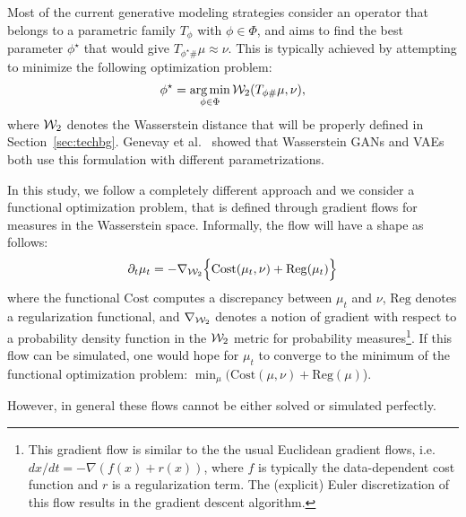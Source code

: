 Most of the current generative modeling strategies consider an operator that belongs to a parametric family $T_{\phi}$ with $\phi \in \Phi$, and aims to find the best parameter $\phi^\star$ that would give $T_{\phi^\star \#}\mu \approx \nu$. This is typically achieved by attempting to minimize the following optimization problem:
\begin{align}
\phi^\star = \operatorname*{arg\min}_{\phi \in \Phi} {\cal W}_2(T_{\phi \#}\mu, \nu),
\end{align}
where ${\cal W}_2$ denotes the Wasserstein distance that will be properly defined in Section~\ref{sec:techbg}. Genevay et al.\ \cite{genevay2017gan} showed that Wasserstein GANs and VAEs both use this formulation with different parametrizations. 

In this study, we follow a completely different approach and we consider a functional optimization problem, that is defined through gradient flows for measures in the Wasserstein space. Informally, the flow will have a shape as follows:
\begin{align}
\partial_t \mu_t = - \nabla_{{\cal W}_2} \Bigl\{ \mathrm{Cost}(\mu_t, \nu) + \mathrm{Reg}(\mu_t)\Bigr\} \label{eqn:gradflow}
\end{align}
where the functional $\mathrm{Cost}$ computes a discrepancy between $\mu_t$ and $\nu$, $\mathrm{Reg}$ denotes a regularization functional, and $\nabla_{{\cal W}_2}$ denotes a notion of gradient with respect to a probability density function in the ${\cal W}_2$ metric for probability measures\footnote{This gradient flow is similar to the the usual Euclidean gradient flows, i.e.\ $dx/dt = - \nabla (f(x) + r(x))$, where $f$ is typically the data-dependent cost function and $r$ is a regularization term. The (explicit) Euler discretization of this flow results in the gradient descent algorithm.}. If this flow can be simulated, one would hope for $\mu_t$ to converge to the minimum of the functional optimization problem: $\min_\mu ( \mathrm{Cost}(\mu, \nu) + \mathrm{Reg}(\mu)$).

However, in general these flows cannot be either solved or simulated perfectly. 
